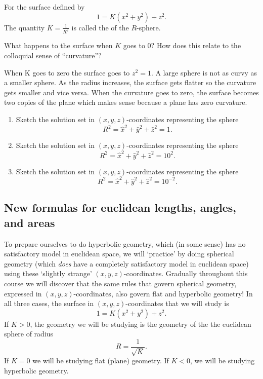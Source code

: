 \documentclass[newpage,hints,handout,12pt,noauthor,nooutcomes]{ximera}
\begin{document}
\begin{definition}
  For the surface defined by
  \[
  1=K\left(  x^{2}+y^{2}\right)  +z^{2}. %
  \]
The quantity $K=\frac{1}{R^{2}}$ is called the  of the
$R$-sphere.
\end{definition}

\begin{problem}
  What happens to the surface when $K$ goes to $0$?  How does this relate to the
  colloquial sense of ``curvature''?
  
\begin{freeResponse}
When K goes to zero the surface goes to $z^{2} =1$.  A large sphere is not as curvy as a smaller sphere. As the radius increases, the surface gets flatter so the curvature gets smaller and vice versa.  When the curvature goes to zero, the surface becomes two copies of the plane which makes sense because a plane has zero curvature.  
\end{freeResponse}

\end{problem}

\begin{problem}\hfil
\begin{enumerate}
\item Sketch the solution set in $\left(  x,y,z\right)  $-coordinates
representing the sphere%
\[
R^{2}=\hat{x}^{2}+\hat{y}^{2}+\hat{z}^{2}=1.
\]

\item Sketch the solution set in $\left(  x,y,z\right)  $-coordinates
representing the sphere%
\[
R^{2}=\hat{x}^{2}+\hat{y}^{2}+\hat{z}^{2}=10^{2}.
\]

\item Sketch the solution set in $\left(  x,y,z\right)  $-coordinates
representing the sphere%
\[
R^{2}=\hat{x}^{2}+\hat{y}^{2}+\hat{z}^{2}=10^{-2}.
\]
\end{enumerate}
%
\end{problem}

\subsection{New formulas for euclidean lengths, angles, and areas}

To prepare ourselves to do hyperbolic geometry, which (in some sense)
has no satisfactory model in euclidean space, we will `practice' by
doing spherical geometry (which \textit{does} have a completely
satisfactory model in euclidean space) using these `slightly strange'
$(x,y,z)$-coordinates. Gradually throughout this course
we will discover that the same rules that govern spherical geometry,
expressed in $(x,y,z)$-coordinates, also govern flat and
hyperbolic geometry! In all three cases, the surface in $\left(
x,y,z\right) $-coordinates that we will study is%
\[
1=K\left(x^{2}+y^{2}\right)+z^{2} .
\]
If $K>0$, the geometry we will be studying is the geometry of the the
euclidean sphere of radius%
\[
R=\frac{1}{\sqrt{K}}.
\]
If $K=0$ we will be studying flat (plane) geometry. If $K<0$, we will be
studying hyperbolic geometry. 
\end{document}
